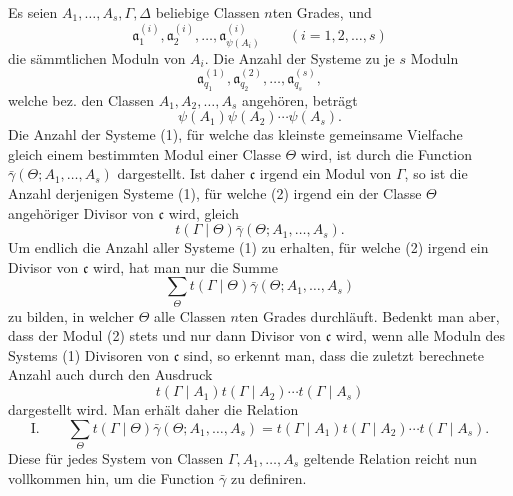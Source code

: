 Es seien $A_1,\ldots,A_s,\Gamma,\Delta$ beliebige Classen $n$ten Grades, und
\[
 \mathfrak a^{(i)}_1,\mathfrak a^{(i)}_2,\ldots,
 \mathfrak a^{(i)}_{\psi(A_i)}\qquad (i=1,2,\ldots,s)
\]
die sämmtlichen Moduln von $A_i$. Die Anzahl der Systeme zu je $s$ Moduln
\begin{equation}
 \mathfrak a^{(1)}_{q_1},\mathfrak a^{(2)}_{q_2},\ldots,
 \mathfrak a^{(s)}_{q_s},
\tag{1}
\end{equation}
welche bez. den Classen $A_1,A_2,\ldots,A_s$ angehören, beträgt
\[
 \psi(A_1)\psi(A_2)\cdots\psi(A_s).
\]
Die Anzahl der Systeme (1), für welche das kleinste gemeinsame Vielfache
\begin{equation}
 [\mathfrak a^{(1)}_{q_1},\mathfrak a^{(2)}_{q_2},\ldots,
 \mathfrak a^{(s)}_{q_s}]
\tag{2}
\end{equation}
gleich einem bestimmten Modul einer Classe $\Theta$ wird, ist durch die Function
$\bar\gamma(\Theta;A_1,\ldots,A_s)$ dargestellt. Ist daher $\mathfrak c$ irgend ein Modul von $\Gamma$, so ist die Anzahl derjenigen Systeme (1), für welche (2) irgend ein der Classe $\Theta$ angehöriger Divisor von $\mathfrak c$ wird, gleich
\[
 t(\Gamma\mid\Theta)\bar\gamma(\Theta;A_1,\ldots,A_s).
\]
Um endlich die Anzahl aller Systeme (1) zu erhalten, für welche (2) irgend ein Divisor von $\mathfrak c$ wird, hat man nur die Summe
\[
 \sum_{\Theta}t(\Gamma\mid\Theta)\bar\gamma(\Theta;A_1,\ldots,A_s)
\]
zu bilden, in welcher $\Theta$ alle Classen $n$ten Grades durchläuft. Bedenkt man aber, dass der Modul (2) stets und nur dann Divisor von $\mathfrak c$ wird, wenn alle Moduln des Systems (1) Divisoren von $\mathfrak c$ sind, so erkennt man, dass die zuletzt berechnete Anzahl auch durch den Ausdruck
\[
 t(\Gamma\mid A_1)t(\Gamma\mid A_2)\cdots t(\Gamma\mid A_s)
\]
dargestellt wird. Man erhält daher die Relation
\[
\text{I.}\qquad
 \sum_{\Theta}t(\Gamma\mid\Theta)\bar\gamma(\Theta;A_1,\ldots,A_s)
 =t(\Gamma\mid A_1)t(\Gamma\mid A_2)\cdots t(\Gamma\mid A_s).
\]
Diese für jedes System von Classen $\Gamma,A_1,\ldots,A_s$ geltende Relation reicht nun vollkommen hin, um die Function $\bar\gamma$ zu definiren.

